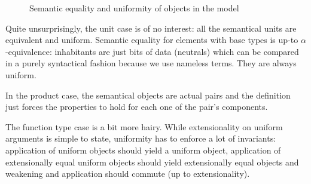 \begin{definition}
\begin{figure*}
\label{logreleq}
\caption{Semantic equality and uniformity of objects in the model}
\end{figure*}

Quite unsurprisingly, the unit case is of no interest: all the semantical units
are equivalent and uniform. Semantic equality for elements with base types is
up-to $\alpha$-equivalence: inhabitants are just bits of data (neutrals) which
can be compared in a purely syntactical fashion because we use nameless terms.
They are always uniform.

In the product case, the semantical objects are actual pairs and the definition
just forces the properties to hold for each one of the pair's components.

The function type case is a bit more hairy. While extensionality on uniform arguments is
simple to state, uniformity has to enforce a lot of invariants: application of uniform
objects should yield a uniform object, application of extensionally equal uniform objects
should yield extensionally equal objects and weakening and application should commute (up
to extensionality).


\end{definition}
